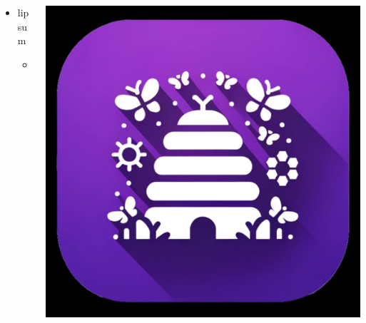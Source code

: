 \documentclass[aspectratio=169]{beamer}
\begin{document}
\begin{frame}{3}

\begin{columns}[T]
    \begin{column}[T]{0.5\textwidth}
        \begin{itemize}
            \item lipsum
            \begin{itemize}
                \item example
            \end{itemize}
        \end{itemize}
    \end{column}
    
    \begin{column}{0.5\textwidth}
        \includegraphics[height=0.8\textheight]{imgs/app_icons/2.png}
    \end{column}
\end{columns}

\end{frame}
\end{document}
